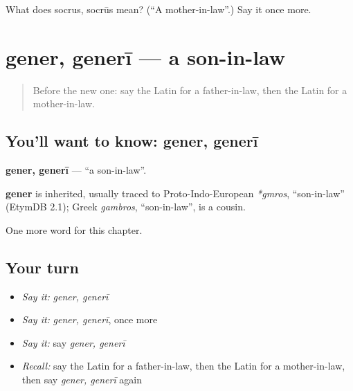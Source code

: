 \begin{tcolorbox}[breakable,colback=teal!4,colframe=teal!35!black,title={Before you move on}]
What does socrus, socrūs mean? (\textquotedblleft{}A mother-in-law\textquotedblright{}.) Say it once more.
\end{tcolorbox}
\section[gener, generī]{gener, generī — a son-in-law}

\label{lesson:LA-C247-gener}



\begin{quote}
Before the new one: say the Latin for a father-in-law, then the Latin for a mother-in-law.
\end{quote}

\subsection*{You'll want to know: gener, generī}
\textbf{gener, generī} — \textquotedblleft{}a son-in-law\textquotedblright{}.

\begin{cousinweb}
\textbf{gener} is inherited, usually traced to Proto-Indo-European \emph{*gmros}, \textquotedblleft{}son-in-law\textquotedblright{} (EtymDB 2.1); Greek \emph{gambros}, \textquotedblleft{}son-in-law\textquotedblright{}, is a cousin.
\end{cousinweb}

\begin{grammarlens}[title={What you've built}]
One more word for this chapter.
\end{grammarlens}

\subsection*{Your turn}
\begin{itemize}
\raggedright
  \item \emph{Say it:} \emph{gener, generī}
  \item \emph{Say it:} \emph{gener, generī}, once more
  \item \emph{Say it:} say \emph{gener, generī}
  \item \emph{Recall:} say the Latin for a father-in-law, then the Latin for a mother-in-law, then say \emph{gener, generī} again
\end{itemize}

